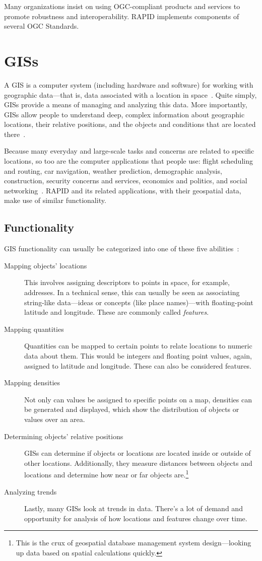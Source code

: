 Many organizations insist on using OGC-compliant products and services to promote robustness and interoperability. RAPID implements components of several OGC Standards.

\section{GISs}
A GIS is a computer system (including hardware and software) for working with geographic data---that is, data associated with a location in space~\cite{Esriintro}. Quite simply, GISs provide a means of managing and analyzing this data. More importantly, GISs allow people to understand deep, complex information about geographic locations, their relative positions, and the objects and conditions that are located there~\cite{Esriintro}.

Because many everyday and large-scale tasks and concerns are related to specific locations, so too are the computer applications that people use: flight scheduling and routing, car navigation, weather prediction, demographic analysis, construction, security concerns and services, economics and politics, and social networking~\cite{Esriintro}. RAPID and its related applications, with their geospatial data, make use of similar functionality.

\subsection{Functionality}
GIS functionality can usually be categorized into one of these five abilities~\cite{Esriintro}:

\begin{description}
  \item[Mapping objects' locations] This involves assigning descriptors to points in space, for example, addresses. In a technical sense, this can usually be seen as associating string-like data---ideas or concepts (like place names)---with floating-point latitude and longitude. These are commonly called \textit{features}.
  \item[Mapping quantities] Quantities can be mapped to certain points to relate locations to numeric data about them. This would be integers and floating point values, again, assigned to latitude and longitude. These can also be considered features.
  \item[Mapping densities] Not only can values be assigned to specific points on a map, densities can be generated and displayed, which show the distribution of objects or values over an area.
  \item[Determining objects' relative positions] GISs can determine if objects or locations are located inside or outside of other locations. Additionally, they measure distances between objects and locations and determine how near or far objects are.\footnote{This is the crux of geospatial database management system design---looking up data based on spatial calculations quickly.}
  \item[Analyzing trends] Lastly, many GISs look at trends in data. There's a lot of demand and opportunity for analysis of how locations and features change over time.
\end{description}

